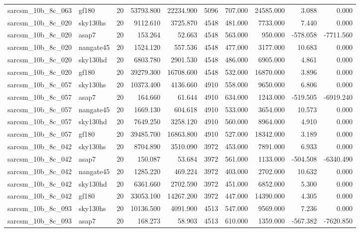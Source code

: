 \begin{tabular}{llrrrrrrrr}
sarcsm\_10b\_8c\_063 & gf180 & 20 & 53793.800 & 22234.900 & 5096 & 707.000 & 24585.000 & 3.088 & 0.000 \\
sarcsm\_10b\_8c\_020 & sky130hs & 20 & 9112.610 & 3725.870 & 4548 & 481.000 & 7733.000 & 7.440 & 0.000 \\
sarcsm\_10b\_8c\_020 & asap7 & 20 & 153.264 & 52.663 & 4548 & 563.000 & 950.000 & -578.058 & -7711.560 \\
sarcsm\_10b\_8c\_020 & nangate45 & 20 & 1524.120 & 557.536 & 4548 & 477.000 & 3177.000 & 10.683 & 0.000 \\
sarcsm\_10b\_8c\_020 & sky130hd & 20 & 6803.780 & 2901.530 & 4548 & 486.000 & 6905.000 & 4.861 & 0.000 \\
sarcsm\_10b\_8c\_020 & gf180 & 20 & 39279.300 & 16708.600 & 4548 & 532.000 & 16870.000 & 3.896 & 0.000 \\
sarcsm\_10b\_8c\_057 & sky130hs & 20 & 10373.400 & 4136.660 & 4910 & 558.000 & 9650.000 & 6.806 & 0.000 \\
sarcsm\_10b\_8c\_057 & asap7 & 20 & 164.660 & 61.644 & 4910 & 634.000 & 1243.000 & -519.505 & -6919.240 \\
sarcsm\_10b\_8c\_057 & nangate45 & 20 & 1669.130 & 604.618 & 4910 & 533.000 & 3654.000 & 10.573 & 0.000 \\
sarcsm\_10b\_8c\_057 & sky130hd & 20 & 7649.250 & 3258.120 & 4910 & 560.000 & 8964.000 & 4.910 & 0.000 \\
sarcsm\_10b\_8c\_057 & gf180 & 20 & 39485.700 & 16863.800 & 4910 & 527.000 & 18342.000 & 3.189 & 0.000 \\
sarcsm\_10b\_8c\_042 & sky130hs & 20 & 8704.890 & 3510.090 & 3972 & 453.000 & 7891.000 & 6.933 & 0.000 \\
sarcsm\_10b\_8c\_042 & asap7 & 20 & 150.087 & 53.684 & 3972 & 561.000 & 1133.000 & -504.508 & -6340.490 \\
sarcsm\_10b\_8c\_042 & nangate45 & 20 & 1285.220 & 469.224 & 3972 & 403.000 & 2702.000 & 10.632 & 0.000 \\
sarcsm\_10b\_8c\_042 & sky130hd & 20 & 6361.660 & 2702.590 & 3972 & 451.000 & 6852.000 & 5.300 & 0.000 \\
sarcsm\_10b\_8c\_042 & gf180 & 20 & 33053.100 & 14267.200 & 3972 & 447.000 & 14390.000 & 4.305 & 0.000 \\
sarcsm\_10b\_8c\_093 & sky130hs & 20 & 10136.500 & 4091.900 & 4513 & 547.000 & 9569.000 & 7.236 & 0.000 \\
sarcsm\_10b\_8c\_093 & asap7 & 20 & 168.273 & 58.903 & 4513 & 610.000 & 1359.000 & -567.382 & -7620.850 \\

\end{tabular}
